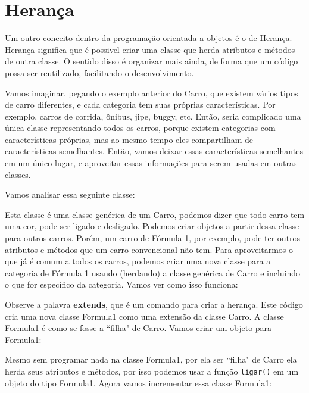 


\section{Herança}
\label{heranca}

Um outro conceito dentro da programação orientada a objetos é o de Herança. Herança 
significa que é possivel criar uma classe que herda atributos e métodos de outra classe. 
O sentido disso é organizar mais ainda, de forma que um código possa ser reutilizado, 
facilitando o desenvolvimento. 

Vamos imaginar, pegando o exemplo anterior do Carro, que existem vários tipos de carro 
diferentes, e cada categoria tem suas próprias características. Por exemplo, carros de 
corrida, ônibus, jipe, buggy, etc. Então, seria complicado uma única classe representando 
todos os carros, porque existem categorias com características próprias, mas ao mesmo 
tempo eles compartilham de características semelhantes. Então, vamos deixar essas 
características semelhantes em um único lugar, e aproveitar essas informações para serem 
usadas em outras classes.

Vamos analisar essa seguinte classe:



Esta classe é uma classe genérica de um Carro, podemos dizer que todo carro tem uma cor, 
pode ser ligado e desligado. Podemos criar objetos a partir dessa classe para outros 
carros. Porém, um carro de Fórmula 1, por exemplo, pode ter outros atributos e métodos 
que um carro convencional não tem. Para aproveitarmos o que já é comum a todos os carros, 
podemos criar uma nova classe para a categoria de Fórmula 1 usando (herdando) a classe 
genérica de Carro e incluindo o que for específico da categoria. Vamos ver como isso 
funciona:



Observe a palavra \textbf{extends}, que é um comando para criar a herança. Este código 
cria uma nova classe Formula1 como uma extensão da classe Carro. A classe Formula1 é como 
se fosse a ``filha" de Carro. Vamos criar um objeto para Formula1:



Mesmo sem programar nada na classe Formula1, por ela ser ``filha" de Carro ela herda 
seus atributos e métodos, por isso podemos usar a função \texttt{ligar()} em um objeto do tipo 
Formula1. Agora vamos incrementar essa classe Formula1:

